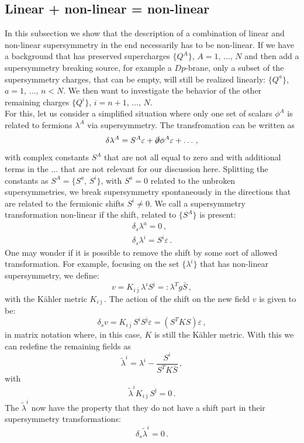 \documentclass[a4paper,12pt]{report}
\newcommand{\be}{\begin{equation}}
\newcommand{\ee}{\end{equation}}
\newcommand{\bea}{\begin{equation}\begin{aligned}}
\newcommand{\eea}{\end{aligned}\end{equation}}
\def\jb{{\bar \jmath}}
\begin{document}
\subsection{Linear + non-linear = non-linear}
In this subsection we show that the description of a combination of linear and non-linear supersymmetry in the end necessarily has to be non-linear. If we have a background that has preserved supercharges $\{Q^A\}$, $A =1,\,\ldots,\,N$ and then add a supersymmetry breaking source, for example a $Dp$-brane, only a subset of the supersymmetry charges, that can be empty, will still be realized linearly: $\{Q^a\}$, $a=1,\,\ldots,\,n<N$. We then want to investigate the behavior of the other remaining charges $\{Q^i\}$, $i=n+1,\,\ldots,\,N$.\\
For this, let us consider a simplified situation where only one set of scalars $\phi^A$ is related to fermions $\lambda^A$ via supersymmetry. The transfromation can be written as
\be 
\delta \lambda^A = S^A \varepsilon + \slashed{\partial}\phi^A \varepsilon + \ldots\,,
\ee
with complex constants $S^A$ that are not all equal to zero and with additional terms in the $\ldots$ that are not relevant for our discussion here. Splitting the constants as $S^A = \{S^a,\,S^i\}$, with $S^a = 0$ related to the unbroken supersymmetries, we break supersymmetry spontaneously in the directions that are related to the fermionic shifts $S^i\neq0$. We call a supersymmetry transformation non-linear if the shift, related to $\{S^A\}$ is present:
\bea 
\delta_s \lambda^a = 0\,,\\
\delta_s \lambda^i = S^i \varepsilon\,.
\eea
One may wonder if it is possible to remove the shift by some sort of allowed transformation. For example, focusing on the set $\{\lambda^i\}$ that has non-linear supersymmetry, we define:
\be 
v=K_{i\jb}\lambda^iS^\jb =: \lambda^T g \bar{S}\,,
\ee
with the Kähler metric $K_{i\jb}$. The action of the shift on the new field $v$ is given to be:
\be 
\delta_s v = K_{i\jb} S^i S^\jb \varepsilon = \left( S^T K S \right) \varepsilon\,,
\ee
in matrix notation where, in this case, $K$ is still the Kähler metric. With this we can redefine the remaining fields as 
\be 
\tilde{\lambda}^i = \lambda^i - \frac{S^i}{S^T K \bar{S}}\,,
\ee
with 
\be 
\tilde{\lambda}^i K_{i\jb} S^\jb = 0\,.
\ee
The $\tilde{\lambda}^i$ now have the property that they do not have a shift part in their supersymmetry transformations:
\be 
\delta_s \tilde{\lambda}^i = 0\,.
\ee
\end{document}
